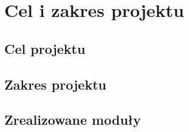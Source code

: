 \chapter{Cel i zakres projektu}

\section{Cel projektu}

\section{Zakres projektu}

\section{Zrealizowane moduły}
